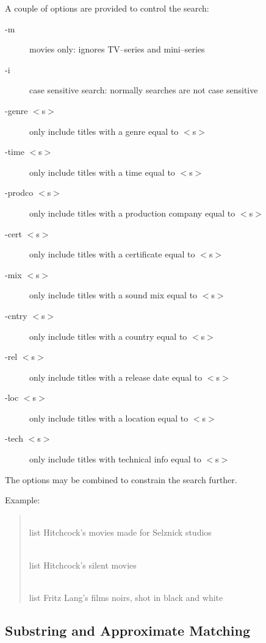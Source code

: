 A couple of options are provided to control the search:
\begin{description}
\item[-m]       movies only: ignores TV--series and mini--series
\item[-i]       case sensitive search: normally searches are not case 
sensitive
\item[-genre $<$s$>$]  only include titles with a genre equal to $<$s$>$
\item[-time $<$s$>$]   only include titles with a time equal to $<$s$>$
\item[-prodco $<$s$>$] only include titles with a production company equal 
to $<$s$>$
\item[-cert $<$s$>$]   only include titles with a certificate equal to 
$<$s$>$
\item[-mix $<$s$>$]    only include titles with a sound mix equal to 
$<$s$>$
\item[-cntry $<$s$>$]  only include titles with a country equal to $<$s$>$
\item[-rel $<$s$>$]    only include titles with a release date equal to $<$s$>$
\item[-loc $<$s$>$]    only include titles with a location equal to $<$s$>$
\item[-tech $<$s$>$]   only include titles with technical info equal to $<$s$>$

\end{description}

The options may be combined to constrain the search further.

Example:
\begin{quotation}
 \\
     list Hitchcock's movies made for Selznick studios

 \\
     list Hitchcock's silent movies

 \\
    list Fritz Lang's films noirs, shot in black and white

\end{quotation}

\subsection{\label{appr}Substring and Approximate Matching}


